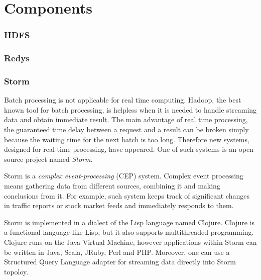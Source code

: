 \chapter{Components}
\label{chap:components}



\subsection{HDFS}

\subsection{Redys}


\subsection{Storm}
Batch processing is not applicable for real time computing.
Hadoop, the best known tool for batch processing, is helpless when it is needed to handle streaming data and obtain immediate result.
The main advantage of real time processing, the guaranteed time delay between a request and a result can be broken simply because the waiting time for the next batch is too long.
Therefore new systems, designed for real-time processing, have appeared.
One of such systems is an open source project named \textit{Storm}.

Storm is a \textit{complex event-processing} (CEP) system.
Complex event processing means gathering data from different sources, combining it and making conclusions from it.
For example, such system keeps track of significant changes in traffic reports or stock market feeds and immediately responds to them. 

Storm is implemented in a dialect of the Lisp language named Clojure.
Clojure is a functional language like Lisp, but it also supports multithreaded programming.
Clojure runs on the Java Virtual Machine, however applications within Storm can be written in Java, Scala, JRuby, Perl and PHP.
Moreover, one can use a Structured Query Language adapter for streaming data directly into Storm topoloy.

